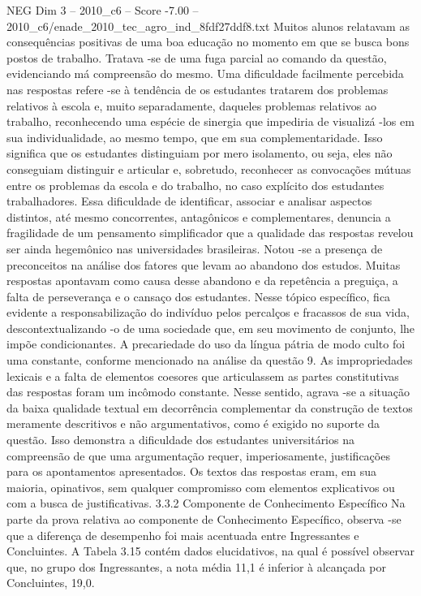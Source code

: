 \begin{textsample}{NEG Dim 3 – 2010\_c6 – Score -7.00 – 2010\_c6/enade\_2010\_tec\_agro\_ind\_8fdf27ddf8.txt}
Muitos alunos relatavam as consequências positivas de uma boa educação no momento em que se busca bons postos de trabalho.
Tratava -se de uma fuga parcial ao comando da questão, evidenciando má compreensão do mesmo.
Uma dificuldade facilmente percebida nas respostas refere -se à tendência de os estudantes tratarem dos problemas relativos à escola e, muito separadamente, daqueles problemas relativos ao trabalho, reconhecendo uma espécie de sinergia que impediria de visualizá -los em sua individualidade, ao mesmo tempo, que em sua complementaridade.
Isso significa que os estudantes distinguiam por mero isolamento, ou seja, eles não conseguiam distinguir e articular e, sobretudo, reconhecer as convocações mútuas entre os problemas da escola e do trabalho, no caso explícito dos estudantes trabalhadores.
Essa dificuldade de identificar, associar e analisar aspectos distintos, até mesmo concorrentes, antagônicos e complementares, denuncia a fragilidade de um pensamento simplificador que a qualidade das respostas revelou ser ainda hegemônico nas universidades brasileiras.
Notou -se a presença de preconceitos na análise dos fatores que levam ao abandono dos estudos.
Muitas respostas apontavam como causa desse abandono e da repetência a preguiça, a falta de perseverança e o cansaço dos estudantes.
Nesse tópico específico, fica evidente a responsabilização do indivíduo pelos percalços e fracassos de sua vida, descontextualizando -o de uma sociedade que, em seu movimento de conjunto, lhe impõe condicionantes.
A precariedade do uso da língua pátria de modo culto foi uma constante, conforme mencionado na análise da questão 9.
As impropriedades lexicais e a falta de elementos coesores que articulassem as partes constitutivas das respostas foram um incômodo constante.
Nesse sentido, agrava -se a situação da baixa qualidade textual em decorrência complementar da construção de textos meramente descritivos e não argumentativos, como é exigido no suporte da questão.
Isso demonstra a dificuldade dos estudantes universitários na compreensão de que uma argumentação requer, imperiosamente, justificações para os apontamentos apresentados.
Os textos das respostas eram, em sua maioria, opinativos, sem qualquer compromisso com elementos explicativos ou com a busca de justificativas. 3.3.2 Componente de Conhecimento Específico Na parte da prova relativa ao componente de Conhecimento Específico, observa -se que a diferença de desempenho foi mais acentuada entre Ingressantes e Concluintes.
A Tabela 3.15 contém dados elucidativos, na qual é possível observar que, no grupo dos Ingressantes, a nota média 11,1 é inferior à alcançada por Concluintes, 19,0.

\end{textsample}
